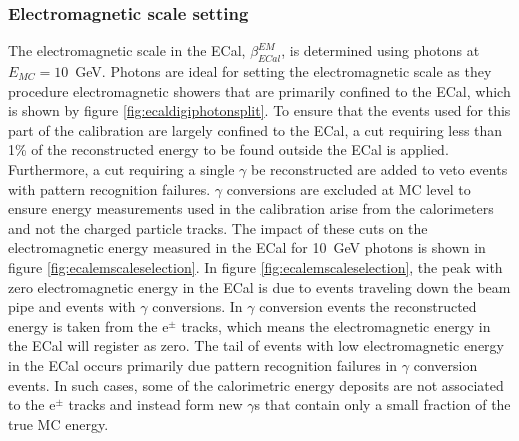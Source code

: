 \subsubsection{Electromagnetic scale setting}
\label{sec:emscalesetting}
The electromagnetic scale in the ECal, $\beta^{EM}_{ECal}$, is determined using photons at $E_{MC} = 10$~GeV.  Photons are ideal for setting the electromagnetic scale as they procedure electromagnetic showers that are primarily confined to the ECal, which is shown by figure \ref{fig:ecaldigiphotonsplit}.  To ensure that the events used for this part of the calibration are largely confined to the ECal, a cut requiring less than 1\% of the reconstructed energy to be found outside the ECal is applied.  Furthermore, a cut requiring a single $\gamma$ be reconstructed are added to veto events with pattern recognition failures.  $\gamma$ conversions are excluded at MC level to ensure energy measurements used in the calibration arise from the calorimeters and not the charged particle tracks.  The impact of these cuts on the electromagnetic energy measured in the ECal for 10~GeV photons is shown in figure \ref{fig:ecalemscaleselection}.  In figure \ref{fig:ecalemscaleselection}, the peak with zero electromagnetic energy in the ECal is due to events traveling down the beam pipe and events with $\gamma$ conversions.  In $\gamma$ conversion events the reconstructed energy is taken from the $\text{e}^{\pm}$ tracks, which means the electromagnetic energy in the ECal will register as zero.  The tail of events with low electromagnetic energy in the ECal occurs primarily due pattern recognition failures in $\gamma$ conversion events.  In such cases, some of the calorimetric energy deposits are not associated to the $\text{e}^{\pm}$ tracks and instead form new $\gamma$s that contain only a small fraction of the true MC energy.  


